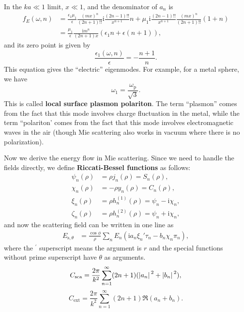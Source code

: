 \documentclass[hyperref, a4paper]{article}
\newcommand*{\ii}{\mathrm{i}}
\newcommand*{\concept}[1]{{\textbf{#1}}}
\begin{document}
In the $ka \ll 1$ limit, $x \ll 1$, and the denominator of $a_n$ is 
\begin{equation}
    \begin{aligned}
        f_E(\omega, n) &= \frac{\epsilon_1 \mu_1}{\epsilon} \frac{(mx)^n}{(2n+1) !!} \ii \frac{(2n-1)!!}{x^{n+1}} n
        + \mu_1 \ii \frac{(2n-1)!!}{x^{n+1}} \frac{(mx)^n}{(2n+1)!!} (1+n) \\
        &= \frac{\mu_1}{\epsilon} \frac{\ii m^n}{(2n+1) x} (\epsilon_1 n + \epsilon (n+1)),
    \end{aligned}
\end{equation}
and its zero point is given by 
\begin{equation}
    \frac{\epsilon_1(\omega, n)}{\epsilon} = - \frac{n+1}{n}.
\end{equation}
This equation gives the ``electric'' eigenmodes. For example, for a metal sphere, we have 
\begin{equation}
    \omega_1 = \frac{\omega_\text{p}}{\sqrt{3}}. 
\end{equation}
This is called \concept{local surface plasmon polariton}. The term ``plasmon'' comes from the fact that 
this mode involves charge fluctuation in the metal, while the term ``polariton' comes from the fact that 
this mode involves electromagnetic waves in the air (though Mie scattering also works in vacuum where 
there is no polarization).

Now we derive the energy flow in Mie scattering. Since we need to handle the fields directly, 
we define \concept{Riccati-Bessel functions} as follows:
\begin{equation}
    \begin{aligned}
        \psi_n(\rho) &= \rho j_n(\rho) = S_n(\rho), \\
        \chi_n(\rho) &= - \rho y_n(\rho) = C_n(\rho), \\
        \xi_n(\rho) &= \rho h_n^{(1)}(\rho) = \psi_n - \ii \chi_n, \\
        \zeta_n(\rho) &= \rho h_n^{(2)}(\rho) = \psi_n + \ii \chi_n,
    \end{aligned}
\end{equation}
and now the scattering field can be written in one line as 
\begin{equation}
    \begin{aligned}
        E_{\text{s}, \theta} &= \frac{\cos \phi}{\rho} \sum_n E_n (\ii a_n \xi_n' \tau_n - b_n \chi_n \pi_n) , 
    \end{aligned}
\end{equation}
where the $^\prime$ superscript means the argument is $r$ and the special functions without prime superscript
have $\theta$ as arguments. 
\begin{equation}
    C_\text{sca} = \frac{2\pi}{k^2} \sum_{n=1}^\infty (2n+1) (\abs*{a_n}^2 + \abs*{b_n}^2),
\end{equation}
\begin{equation}
    C_\text{ext} = \frac{2\pi}{k^2} \sum_{n=1}^\infty (2n+1) \Re (a_n + b_n).
\end{equation}
\end{document}
